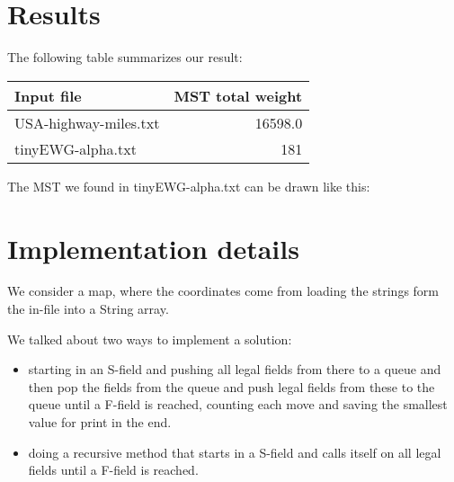 







  \maketitle


  \section{Results}
  
  
  
  

  The following table summarizes our result:
  
    \bigskip\noindent
  \begin{tabular}{lr}
  	\toprule
  	Input file & MST total weight \\ \midrule
  	USA-highway-miles.txt	 & 16598.0 \\
  	tinyEWG-alpha.txt & 181 \\ \bottomrule
  \end{tabular}
  
    \bigskip
  
     The MST we found in tinyEWG-alpha.txt can be drawn like this:
     
     


  
  \section{Implementation details}
  
  We consider a map, where the coordinates come from loading the strings form the in-file into a String array.

  We talked about two ways to implement a solution:
  
  \begin{itemize}
  	\item starting in an S-field and pushing all legal fields from there to a queue and then pop the fields from the queue and push legal fields from these to the queue until a F-field is reached, counting each move and saving the smallest value for print in the end.
  	\item doing a recursive method that starts in a S-field and calls itself on all legal fields until a F-field is reached.
  	
 \end{itemize}	
 

